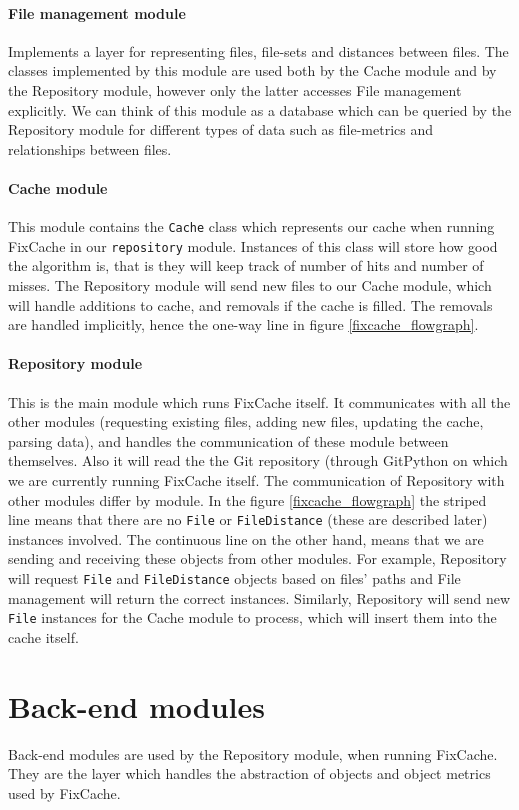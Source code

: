 \documentclass[12pt,twoside,notitlepage]{report}
\newcommand{\fxch}{FixCache}
\begin{document}
\paragraph{File management module}Implements a layer for representing files, file-sets and distances between files. The classes implemented by this module are used both by the Cache module and by the Repository module, however only the latter accesses File management explicitly. We can think of this module as a database which can be queried by the Repository module for different types of data such as file-metrics and relationships between files.

\paragraph{Cache module}This module contains the \texttt{Cache} class which represents our cache when running \fxch{} in our \texttt{repository} module. Instances of this class will store how good the algorithm is, that is they will keep track of number of hits and number of misses. The Repository module will send new files to our Cache module, which will handle additions to cache, and removals if the cache is filled. The removals are handled implicitly, hence the one-way line in figure \ref{fixcache_flowgraph}.

\paragraph{Repository module}This is the main module which runs \fxch{} itself. It communicates with all the other modules (requesting existing files, adding new files, updating the cache, parsing data), and handles the communication of these module between themselves. Also it will read the the Git repository (through GitPython on which we are currently running \fxch{} itself. The communication of Repository with other modules differ by module. In the figure \ref{fixcache_flowgraph} the striped line means that there are no \texttt{File} or \texttt{FileDistance} (these are described later) instances involved. The continuous line on the other hand, means that we are sending and receiving these objects from other modules. For example, Repository will request \texttt{File} and \texttt{FileDistance} objects based on files' paths and File management will return the correct instances. Similarly, Repository will send new \texttt{File} instances for the Cache module to process, which will insert them into the cache itself.
\section{Back-end modules} Back-end modules are used by the Repository module, when running \fxch{}. They are the layer which handles the abstraction of objects and object metrics used by \fxch{}.
\end{document}
